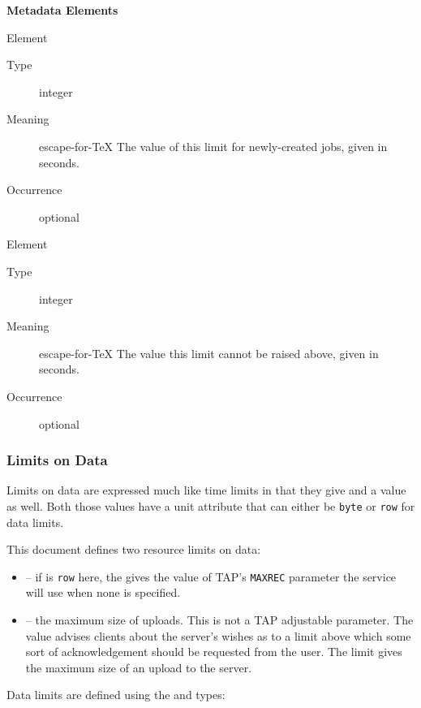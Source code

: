 \documentclass{ivoa}
\begin{document}
\vspace{0.5ex}\noindent\textbf{ Metadata Elements}

\begingroup\small\begin{bigdescription}\item[Element \xmlel{default}]
\begin{description}
\item[Type] integer
\item[Meaning] escape-for-TeX{{{
          The value of this limit for newly-created jobs, given in seconds.
          }}}
\item[Occurrence] optional

\end{description}
\item[Element \xmlel{hard}]
\begin{description}
\item[Type] integer
\item[Meaning] escape-for-TeX{{{
          The value this limit cannot be raised above, given in seconds.
          }}}
\item[Occurrence] optional

\end{description}


\end{bigdescription}\endgroup

\endgroup

\subsubsection{Limits on Data}
Limits on data are expressed much like time limits in that they give
 and a  value as well.  
Both those values have a unit attribute that can either be \texttt{byte}
or \texttt{row} for data limits.

This document defines two resource limits on data:


\begin{itemize}

\item {} -- if  is \texttt{row} here,
the  gives the
value of TAP's \texttt{MAXREC} parameter the service will use when none
is specified.{}

\item {} -- the maximum size of uploads.  This 
is not a TAP adjustable parameter.  The  value
advises clients about the server's wishes as to a limit above which
some sort of acknowledgement should be requested from the user.  The 
 limit gives the maximum size of an upload to the 
server.{}

\end{itemize}
Data limits are defined using the 
and  types:
\end{document}
